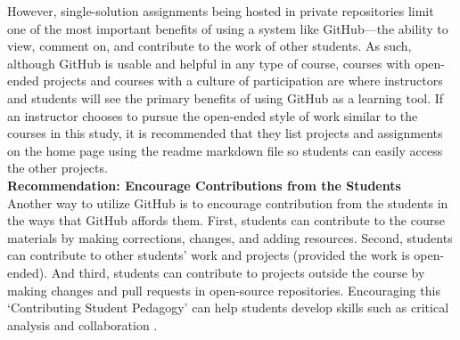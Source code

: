 

However, single-solution assignments being hosted in private repositories limit one of the most important benefits of using a system like GitHub---the ability to view, comment on, and contribute to the work of other students. As such, although GitHub is usable and helpful in any type of course, courses with open-ended projects and courses with a culture of participation are where instructors and students will see the primary benefits of using GitHub as a learning tool. If an instructor chooses to pursue the open-ended style of work similar to the courses in this study, it is recommended that they list projects and assignments on the home page using the readme markdown file so students can easily access the other projects.
\\

\textbf{Recommendation: Encourage Contributions from the Students} \\
Another way to utilize GitHub is to encourage contribution from the students in the ways that GitHub affords them. First, students can contribute to the course materials by making corrections, changes, and adding resources. Second, students can contribute to other students' work and projects (provided the work is open-ended). And third, students can contribute to projects outside the course by making changes and pull requests in open-source repositories. Encouraging this `Contributing Student Pedagogy' can help students develop skills such as critical analysis and collaboration \cite{falkner2012supporting}.

